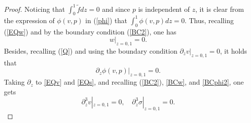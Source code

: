 \documentclass[12pt,reqno]{amsart}
\numberwithin{equation}{section}
\begin{document}
\begin{proof}
Noticing that $\int_0^1\tilde fdz=0$ and since $p$ is independent of $z$, it is clear from the expression of $\phi(v,p)$ in (\ref{phi}) that
$\int_0^1\phi(v,p)dz=0.$
Thus, recalling (\ref{EQw}) and by the boundary condition (\ref{BC2}), one has
\begin{equation}
  \label{BCw}
  w|_{z=0,1}=0.
\end{equation}
Besides, recalling (\ref{Q}) and using the boundary condition $\partial_zv|_{z=0,1}=0$, it holds that
\begin{equation}
  \label{BCphi2}
  \partial_z\phi(v,p)|_{z=0,1}=0.
\end{equation}
Taking $\partial_z$ to \eqref{EQv} and \eqref{EQs}, and recalling (\ref{BC2}), \eqref{BCw}, and \eqref{BCphi2}, one gets
\begin{equation}
  \label{BC3}
  \partial_z^3v|_{z=0,1}=0,\quad\partial_z^3\sigma|_{z=0,1}=0.
\end{equation}


\end{proof}
\end{document}
